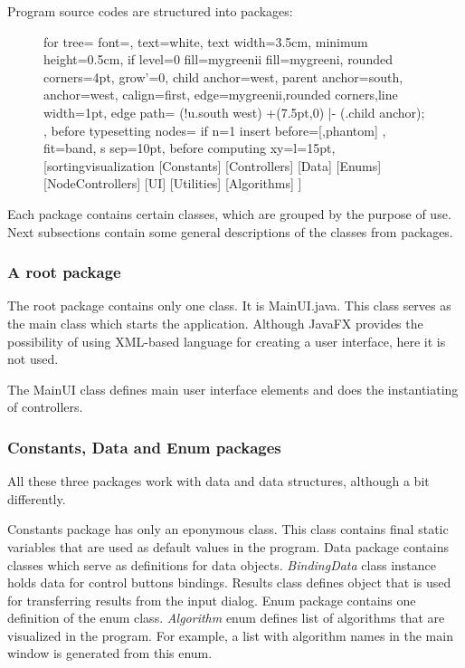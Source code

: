 \documentclass[
  field=inf,
  biblatex,
  language=english,
  glossaries,
  theorems=false,
  index
]{kidiplom}
\begin{document}
Program source codes are structured into packages:
\begin{figure}[H]
	\begin{flushleft}
		\begin{forest}
			for tree={
    		font=\sffamily,
    		text=white,
    		text width=3.5cm,
    		minimum height=0.5cm,
    		if level=0
    		  {fill=mygreenii}
    		  {fill=mygreeni},
    		rounded corners=4pt,
    		grow'=0,
    		child anchor=west,
    		parent anchor=south,
    		anchor=west,
    		calign=first,
    		edge={mygreenii,rounded corners,line width=1pt},
    		edge path={
    		  \noexpand{}
    		  (!u.south west) +(7.5pt,0) |- (.child anchor);
		    },
    		before typesetting nodes={
      		if n=1
        		{insert before={[,phantom]}}
        		{}
    		},
    		fit=band,
    		s sep=10pt,
    		before computing xy={l=15pt},
  		}
		[sortingvisualization
		  [Constants]
  		  [Controllers]
		  [Data]
		  [Enums]
		  [NodeControllers]
		  [UI]
		  [Utilities]
		  [Algorithms]
		]
		\end{forest}
	\end{flushleft}
\end{figure}

Each package contains certain classes, which are grouped by the purpose of use. Next subsections contain some general descriptions of the classes from packages. 
\subsubsection{A root package}
The root package contains only one class. It is MainUI.java. This class serves as the main class which starts the application. Although JavaFX provides the possibility of using XML-based language for creating a user interface, here it is not used. 

The MainUI class defines main user interface elements and does the instantiating of controllers.

\subsubsection{Constants, Data and Enum packages}
All these three packages work with data and data structures, although a bit differently.

Constants package has only an eponymous class. This class contains final static variables that are used as default values in the program. Data package contains classes which serve as definitions for data objects. \textit{BindingData} class instance holds data for control buttons bindings. Results class defines object that is used for transferring results from the input dialog. Enum package contains one definition of the enum class. \textit{Algorithm} enum defines list of algorithms that are visualized in the program. For example, a list with algorithm names in the main window is generated from this enum.
\end{document}
